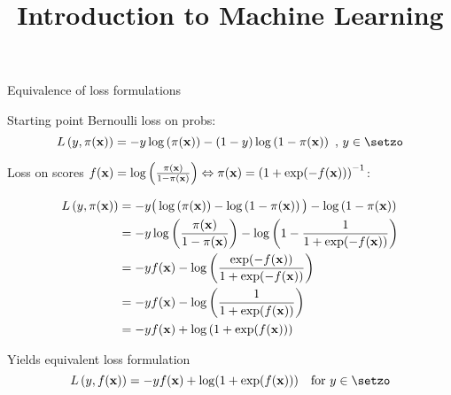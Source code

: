 \documentclass[11pt,compress,t,notes=noshow, xcolor=table]{beamer}
\title{Introduction to Machine Learning}
\begin{document}

\begin{frame2}[small]{Equivalence of loss formulations}

\begin{itemizeS}
\item Starting point Bernoulli loss on probs: 
$$
\Lpixy = - y \log \left(\pix\right) - (1 - y) \log \left(1 - \pix\right)\,\,, \, y \in \setzo
$$

\item Loss on scores $f(\mathbf{x}) = \log\left(\frac{\pi(\mathbf{x})}{1 - \pi(\mathbf{x})}\right) \Leftrightarrow \pi(\mathbf{x}) = \left(1 + \exp(-f(\mathbf{x}))\right)^{-1}$:

\begin{align*}
L\left(y, \pi(\mathbf{x})\right) &= -y \big(\log \left(\pi(\mathbf{x})\right) - \log \left(1 - \pi(\mathbf{x})\right)\big) - \log \left(1 - \pi(\mathbf{x})\right) \\
&= -y \log\left(\frac{\pi(\mathbf{x})}{1-\pi(\mathbf{x})} \right) - \log \left(1-\frac{1}{1+ \exp(-f(\mathbf{x}))} \right) \\
&= -y f(\mathbf{x}) - \log \left(\frac{\exp(-f(\mathbf{x}))}{1+\exp(-f(\mathbf{x}))} \right) \\
&= -y f(\mathbf{x}) - \log \left(\frac{1}{1+\exp(f(\mathbf{x}))} \right) \\
&= -y f(\mathbf{x}) + \log \left(1+\exp(f(\mathbf{x})) \right) 
\end{align*}

\item Yields equivalent loss formulation
$$\Lxy = - \yf + \log(1 + \exp(\fx)) \quad \text{for } y \in \setzo$$
\end{itemizeS}

\end{frame2}
\end{document}
